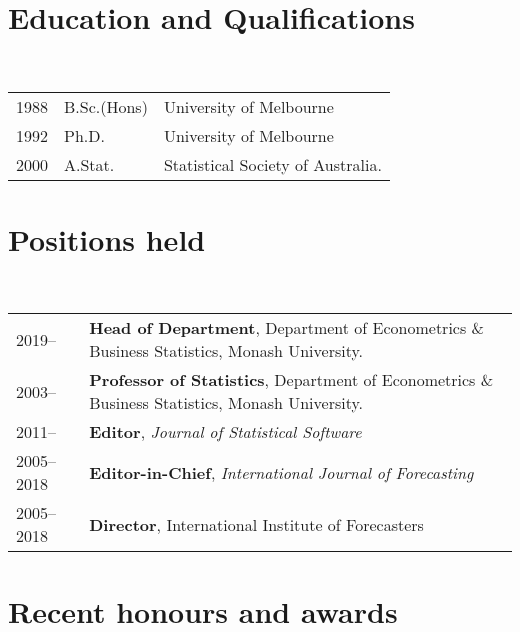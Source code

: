 \documentclass[a4paper,10pt]{article}
\begin{document}
\maketitle

\section{Education and Qualifications}

~\begin{tabular}{lll}
1988 & B.Sc.(Hons) & University of Melbourne\\
1992 & Ph.D. & University of Melbourne\\
2000 & A.Stat. & Statistical Society of Australia.
\end{tabular}

\section{Positions held}

~\begin{tabular}{lP{15cm}}
2019--& \textbf{Head of Department},
        Department of Econometrics \& Business Statistics, Monash University.\\
2003--& \textbf{Professor of Statistics},
        Department of Econometrics \& Business Statistics, Monash University. \\
2011-- & \textbf{Editor}, \textit{Journal of Statistical Software} \\
2005--2018 & \textbf{Editor-in-Chief}, \textit{International Journal of Forecasting} \\
2005--2018 & \textbf{Director}, International Institute of Forecasters \\
  \end{tabular}

\section{Recent honours and awards}
\end{document}
